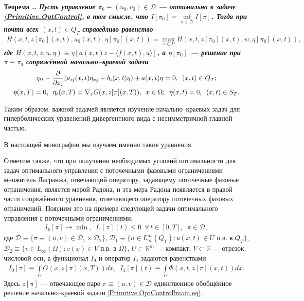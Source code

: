 \documentclass{report}
\newcounter{rem}[section]
\newcounter{lem}[section]
\newcounter{theor}[section]
\renewcommand{\thetheor}{\thesection.\arabic{theor}}
\newenvironment{Theorem}{\par\refstepcounter{theor}\bf Теорема \thetheor. \it}{\rm\par}
\begin{document}
\begin{Theorem}
Пусть управление $\pi_0\equiv(u_0,v_0)\in\mathcal{D}$ --- оптимально в задаче \eqref{Primitive.OptControl}, в том смысле, что $I[\pi_0]=\inf\limits_{\pi\in\mathcal{D}}I[\pi]$. Тогда при
почти всех $(x,t)\in Q_T$ справедливо равенство
\begin{gather}\label{Primitive.OptControl!maximum.principle}
H(x,t,z[\pi_0](x,t),u_0(x,t),\eta[\pi_0](x,t))=\max\limits_{w\in U}H(x,t,z[\pi_0](x,t),w,\eta[\pi_0](x,t)),
\end{gather}
где $H(x,t,z,u,\eta)\equiv\eta[a(x,t)z-\langle f(x,t),u\rangle]$, а $\eta[\pi_0]$ --- решение при $\pi\equiv\pi_0$ сопряжённой начально--краевой задачи
\begin{gather}\label{Primitive.OptControl!adjoint.problem}
\eta_{tt}-\frac{\partial}{\partial x_i}(a_{ij}(x,t)\eta_{x_j}+b_i(x,t)\eta)+a(x,t)\eta=0,\,\,\,(x,t)\in Q_T;\\
\notag \eta(x,T)=0,\,\,\,\eta_t(x,T)=\nabla_zG(x,z[\pi](x,T)),\,\,\,x\in\Omega;\,\,\,\eta(x,t)=0,\,\,\,(x,t)\in S_T.
\end{gather}
\end{Theorem}

Таким образом, важной задачей является изучение начально--краевых задач для гиперболических уравенений дивергентного вида с несимметричной главной частью.

В настоящей монографии мы изучаем именно такие уравнения.

Отметим также, что при получении необходимых условий оптимальности для задач оптимального управления с поточечными фазовыми ограничениями множитель Лагранжа, отвечающий оператору,
задающему поточечные фазовые ограничения, является мерой Радона, и эта мера Радона появляется в правой части сопряжённого уравнения, отвечающего оператору поточечных фазовых ограничений.
Поясним это на примере следующей задачи оптимального управления с поточечными ограничениями:
\begin{gather}\label{State.OptControl}
I_0[\pi]\to\min,\,\,\,I_1[\pi](t)\leqslant0\,\,\,\forall\,t\in[0,T],\,\,\,\pi\in\mathcal{D},
\end{gather}
где $\mathcal{D}\equiv\{\pi\equiv(u,v)\in\mathcal{D}_1\times\mathcal{D}_2\}$, $\mathcal{D}_1\equiv\{u\in L_\infty^m(Q_T):u(x,t)\in U\text{ п.в. в $Q_T$}\}$, $\mathcal{D}_2\equiv\{v\in
L_\infty(\Omega):v(x)\in V\text{ п.в. в $\Omega$}\}$, $U\subset \mathbb{R}^m$ --- компакт, $V\subset\mathbb{R}$ --- отрезок числовой оси, а функционал $I_0$ и оператор $I_1$ задаются
равенствами
\begin{gather*}
I_0[\pi]\equiv\int\limits_\Omega G(x,z[\pi](x,T))dx,\,\,\,I_1[\pi](t)\equiv\int\limits_\Omega\Phi(x,t,z[\pi](x,t))dx.
\end{gather*}
Здесь $z[\pi]$ --- отвечающее паре $\pi\equiv(u,v)\in\mathcal{D}$ единственное обобщённое решение начально--краевой задачи \eqref{Primitive.OptControl!main.eq}.
\end{document}
